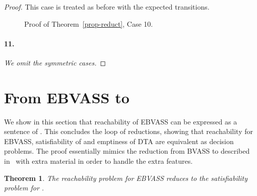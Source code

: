 \documentclass{CSML}
\newtheorem{theorem}{Theorem}
\newcommand\bvass{\textup{BVASS}\xspace}
\newcommand\ebvass{\textup{EBVASS}\xspace}
\newcommand\dad{\textup{DTA}\xspace}
\begin{document}
\begin{proof}
\noindent 
This case is treated as before with the expected transitions.

\begin{figure}
\small

\caption{Proof of Theorem~\ref{prop-reduct}, Case 10.}
\label{fig-reduct10}
\end{figure}




\paragraph{\bf 11.} 
\emph{We omit the symmetric cases.}
\end{proof}


\section{From \texorpdfstring{\ebvass}{EBVASS} to \texorpdfstring{\fotwo}{FO2}}\label{sec-counter-fotwo}

We show in this section that reachability of \ebvass 
can be expressed as a sentence of \fotwo. 
This concludes the loop of reductions, showing that 
reachability for \ebvass, satisfiability of \fotwo and emptiness of \dad 
are equivalent as decision problems. 
The proof essentially mimics the reduction from \bvass to \fotwo described 
in~\cite{BojanczykMSS09jacm} with
extra material in order to handle the extra features.

\begin{theorem}\label{thm-bvass-fodeux}
 The reachability problem for \ebvass reduces to the satisfiability problem for \fotwo.
\end{theorem}
\end{document}
